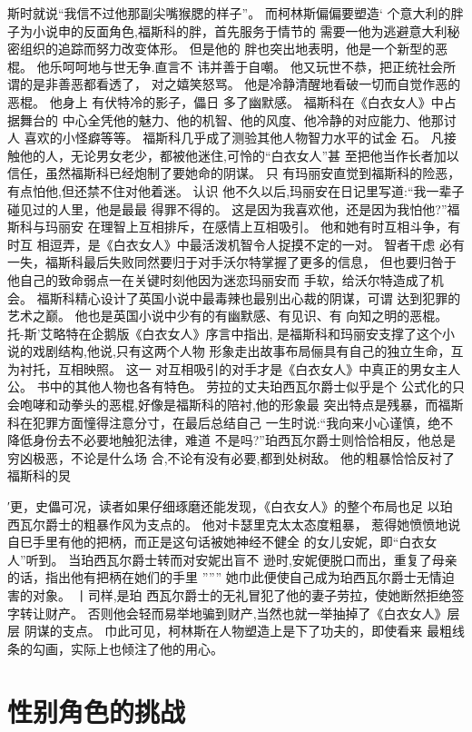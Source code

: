 \documentclass[a4paper]{article}
\begin{document}
斯时就说“我信不过他那副尖嘴猴腮的样子”。 而柯林斯偏偏要塑造`
个意大利的胖子为小说申的反面角色,福斯科的胖，首先服务于情节的
需要一他为逃避意大利秘密组织的追踪而努力改变体形。 但是他的
胖也突出地表明，他是一个新型的恶棍。 他乐呵呵地与世无争.直言不
讳并善于自嘲。 他又玩世不恭，把正统社会所谓的是非善恶都看透了，
对之嬉笑怒骂。 他是冷静清醒地看破一切而自觉作恶的恶棍。 他身上
有伏特冷的影子，儡日 多了幽默感。 福斯科在《白衣女人》中占据舞台的
中心全凭他的魅力、他的机智、他的风度、他冷静的对应能力、他那讨人
喜欢的小怪癖等等。 福斯科几乎成了测验其他人物智力水平的试金
石。 凡接触他的人，无论男女老少，都被他迷住,可怜的“白衣女人”甚
至把他当作长者加以信任，虽然福斯科已经炮制了要她命的阴谋。 只
有玛丽安直觉到福斯科的险恶，有点怕他,但还禁不住对他着迷。 认识
他不久以后,玛丽安在日记里写道:“我一辈子碰见过的人里，他是最最
得罪不得的。 这是因为我喜欢他，还是因为我怕他?”福斯科与玛丽安
在理智上互相排斥，在感情上互相吸引。 他和她有时互相斗争，有时互
相逗弄，是《白衣女人》中最活泼机智令人捉摸不定的一对。 智者干虑
必有一失，福斯科最后失败同然要归于对手沃尔特掌握了更多的信息，
但也要归咎于他自己的致命弱点一在关键时刻他因为迷恋玛丽安而
手软，给沃尔特造成了机会。
福斯科精心设计了英国小说中最毒辣也最别出心裁的阴谋，可谓
达到犯罪的艺术之巅。 他也是英国小说中少有的有幽默感、有见识、有
向知之明的恶棍。 托-斯'艾略特在企鹅版《白衣女人》序言中指出,
是福斯科和玛丽安支撑了这个小说的戏剧结构,他说,只有这两个人物
形象走出故事布局俪具有自己的独立生命，互为衬托，互相映照。 这一
对互相吸引的对手才是《白衣女人》中真正的男女主人公。
书中的其他人物也各有特色。 劳拉的丈夫珀西瓦尔爵士似乎是个
公式化的只会咆哮和动拳头的恶棍,好像是福斯科的陪衬,他的形象最
突出特点是残暴，而福斯科在犯罪方面憧得注意分寸，在最后总结自己
一生时说:“我向来小心谨慎，绝不降低身份去不必要地触犯法律，难道
不是吗?”珀西瓦尔爵士则恰恰相反，他总是穷凶极恶，不论是什么场
合,不论有没有必要,都到处树敌。 他的粗暴恰恰反衬了福斯科的炅

′更，史儡可况，读者如果仔细琢磨还能发现，《白衣女人》的整个布局也足
以珀西瓦尔爵士的粗暴作风为支点的。 他对卡瑟里克太太态度粗暴，
惹得她愤愤地说自巳手里有他的把柄，而正是这句话被她神经不健全
的女儿安妮，即“白衣女人”听到。 当珀西瓦尔爵士转而对安妮出盲不
逊时,安妮便脱口而出，重复了母亲的话，指出他有把柄在她们的手里
'''''' 她巾此便使自己成为珀西瓦尔爵士无情迫害的对象。 丨司样,是珀
西瓦尔爵士的无礼冒犯了他的妻子劳拉，使她断然拒绝签字转让财产。
否则他会轻而易举地骗到财产,当然也就一举抽掉了《白衣女人》层层
阴谋的支点。 巾此可见，柯林斯在人物塑造上是下了功夫的，即使看来
最粗线条的勾画，实际上也倾注了他的用心。

\section{性别角色的挑战}
\end{document}
